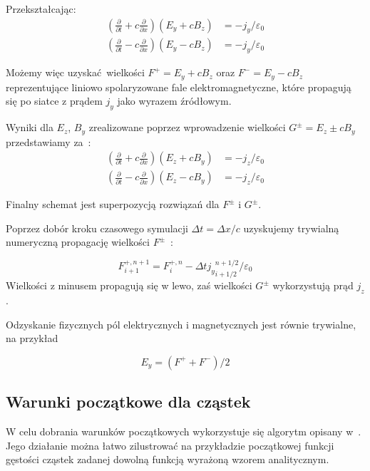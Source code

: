 Przekształcając:
\begin{align}
    \left(\frac{\partial}{\partial t} + c \frac{\partial}{\partial x}\right)\left(E_y + c B_z\right) &= - j_y / \varepsilon_0\\
    \left(\frac{\partial}{\partial t} - c \frac{\partial}{\partial x}\right)\left(E_y - c B_z\right) &= - j_y / \varepsilon_0
\end{align}

Możemy więc uzyskać wielkości $F^+ = E_y + c B_z$ oraz $F^- = E_y - c B_z$ reprezentujące liniowo spolaryzowane fale elektromagnetyczne, które propagują się po siatce z prądem $j_y$ jako wyrazem źródłowym.

Wyniki dla $E_z$, $B_y$ zrealizowane poprzez wprowadzenie wielkości $G^\pm = E_z \pm c B_y$ przedstawiamy za~\cite{birdsall}:
\begin{align}
    \left(\frac{\partial}{\partial t} + c \frac{\partial}{\partial x}\right)\left(E_z + c B_y\right) &= - j_z / \varepsilon_0 \\
    \left(\frac{\partial}{\partial t} - c \frac{\partial}{\partial x}\right)\left(E_z - c B_y\right) &= - j_z / \varepsilon_0
\end{align}

Finalny schemat jest superpozycją rozwiązań dla $F^\pm$ i $G^\pm$.

Poprzez dobór kroku czasowego symulacji $\Delta t = \Delta x / c$ uzyskujemy trywialną numeryczną propagację wielkości $F^\pm$~\cite{Jablonski-notes}:

\begin{equation}
    {F}^{+,n+1}_{i+1} = F^{+,n}_i - \Delta t {j_y}_{i+1/2}^{n+1/2} / \varepsilon_0
\end{equation}
Wielkości z minusem propagują się w lewo, zaś wielkości $G^\pm$ wykorzystują prąd $j_z$.


Odzyskanie fizycznych pól elektrycznych i magnetycznych jest równie trywialne, na przykład 

\begin{equation}
E_y = \left( F^+ + F^- \right)/2
\end{equation}


\subsection{Warunki początkowe dla cząstek}

W celu dobrania warunków początkowych wykorzystuje się algorytm opisany w~\cite{birdsall}.
Jego działanie można łatwo zilustrować na
przykładzie początkowej funkcji gęstości cząstek zadanej dowolną funkcją
wyrażoną wzorem analitycznym.

